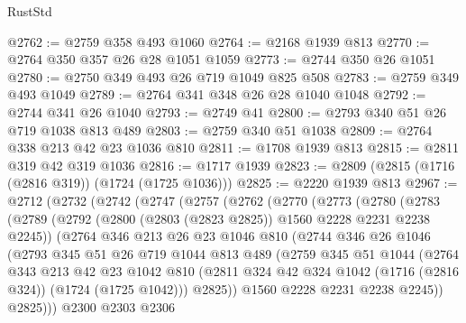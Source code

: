 \begin{lexlean}{RustStd}
\begin{coremodule}
@2762 := @2759 @358 @493 @1060
@2764 := @2168 @1939 @813
@2770 := @2764 @350 @357 @26 @28 @1051 @1059
@2773 := @2744 @350 @26 @1051
@2780 := @2750 @349 @493 @26 @719 @1049 @825 @508
@2783 := @2759 @349 @493 @1049
@2789 := @2764 @341 @348 @26 @28 @1040 @1048
@2792 := @2744 @341 @26 @1040
@2793 := @2749 @41
@2800 := @2793 @340 @51 @26 @719 @1038 @813 @489
@2803 := @2759 @340 @51 @1038
@2809 := @2764 @338 @213 @42 @23 @1036 @810
@2811 := @1708 @1939 @813
@2815 := @2811 @319 @42 @319 @1036
@2816 := @1717 @1939
@2823 := @2809 (@2815 (@1716 (@2816 @319)) (@1724 (@1725 @1036)))
@2825 := @2220 @1939 @813
@2967 := @2712
    (@2732
      (@2742
        (@2747
          (@2757
            (@2762
              (@2770
                (@2773
                  (@2780
                    (@2783
                      (@2789
                        (@2792 (@2800 (@2803 (@2823 @2825)) @1560 @2228 @2231 @2238 @2245))
                        (@2764
                          @346
                          @213
                          @26
                          @23
                          @1046
                          @810
                          (@2744
                            @346
                            @26
                            @1046
                            (@2793
                              @345
                              @51
                              @26
                              @719
                              @1044
                              @813
                              @489
                              (@2759
                                @345
                                @51
                                @1044
                                (@2764
                                  @343
                                  @213
                                  @42
                                  @23
                                  @1042
                                  @810
                                  (@2811
                                    @324
                                    @42
                                    @324
                                    @1042
                                    (@1716 (@2816 @324))
                                    (@1724 (@1725 @1042)))
                                  @2825))
                              @1560
                              @2228
                              @2231
                              @2238
                              @2245))
                          @2825)))
                    @2300
                    @2303
                    @2306

\end{coremodule}
\end{lexlean}
